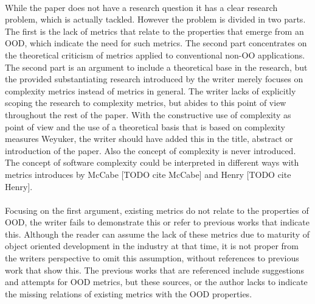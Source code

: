 \paragraph{}
While the paper does not have a research question it has a clear research problem, which is actually tackled.
However the problem is divided in two parts. The first is the lack of metrics that relate to the properties that
emerge from an OOD, which indicate the need for such metrics. The second part concentrates on the theoretical
criticism of metrics applied to conventional non-OO applications. The second part is an argument to include a
theoretical base in the research, but the provided substantiating research introduced by the writer merely focuses on
complexity metrics instead of metrics in general. The writer lacks of explicitly scoping the research to complexity
metrics, but abides to this point of view throughout the rest of the paper. With the constructive use of complexity as
point of view and the use of a theoretical basis that is based on complexity measures Weyuker, the writer should have
added this in the title, abstract or introduction of the paper. Also the concept of complexity is never introduced.
The concept of software complexity could be interpreted in different ways with metrics introduces by McCabe
[TODO cite McCabe] and Henry [TODO cite Henry].

\paragraph{}
Focusing on the first argument, existing metrics do not relate to the properties of OOD, the writer fails to
demonstrate this or refer to previous works that indicate this. Although the reader can assume the lack of these
metrics due to maturity of object oriented development in the industry at that time, it is not proper from the writers
perspective to omit this assumption, without references to previous work that show this. The previous works that are
referenced include suggestions and attempts for OOD metrics, but these sources, or the author lacks to indicate the
missing relations of existing metrics with the OOD properties.

